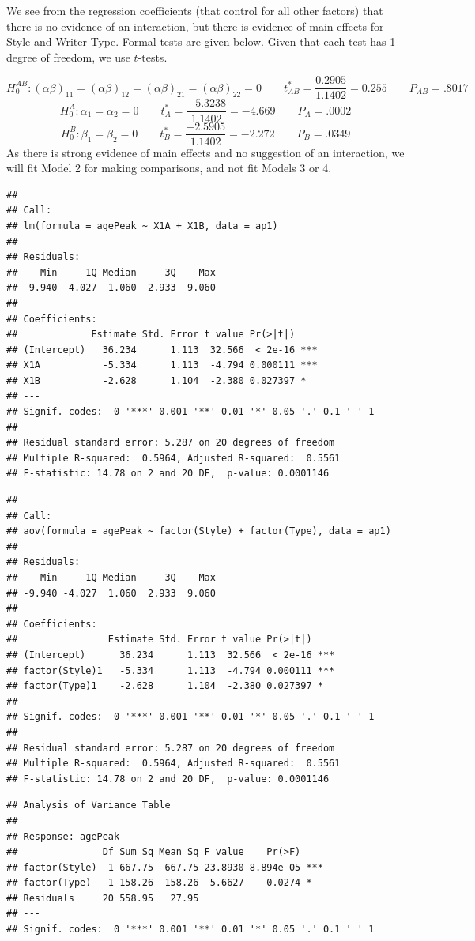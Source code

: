 \documentclass[
]{book}
\begin{document}
We see from the regression coefficients (that control for all other
factors) that there is no evidence of an interaction, but there is
evidence of main effects for Style and Writer Type. Formal tests are
given below. Given that each test has 1 degree of freedom, we use
\(t\)-tests.

\[
H_0^{AB}: (\alpha\beta)_{11}=(\alpha\beta)_{12}=(\alpha\beta)_{21}=(\alpha\beta)_{22}=0
\qquad
t_{AB}^*=\frac{0.2905}{1.1402}=0.255
\qquad P_{AB}=.8017
\] \[
H_0^A:\alpha_1=\alpha_2=0 \qquad
t_A^*=\frac{-5.3238}{1.1402}=-4.669 \qquad P_A=.0002
\] \[
H_0^B: \beta_1=\beta_2=0 \qquad
t_B^*=\frac{-2.5905}{1.1402}=-2.272   \qquad P_B=.0349
\] As there is strong evidence of main effects and no suggestion of an
interaction, we will fit Model 2 for making comparisons, and not fit
Models 3 or 4.

\begin{verbatim}
## 
## Call:
## lm(formula = agePeak ~ X1A + X1B, data = ap1)
## 
## Residuals:
##    Min     1Q Median     3Q    Max 
## -9.940 -4.027  1.060  2.933  9.060 
## 
## Coefficients:
##             Estimate Std. Error t value Pr(>|t|)    
## (Intercept)   36.234      1.113  32.566  < 2e-16 ***
## X1A           -5.334      1.113  -4.794 0.000111 ***
## X1B           -2.628      1.104  -2.380 0.027397 *  
## ---
## Signif. codes:  0 '***' 0.001 '**' 0.01 '*' 0.05 '.' 0.1 ' ' 1
## 
## Residual standard error: 5.287 on 20 degrees of freedom
## Multiple R-squared:  0.5964, Adjusted R-squared:  0.5561 
## F-statistic: 14.78 on 2 and 20 DF,  p-value: 0.0001146
\end{verbatim}

\begin{verbatim}
## 
## Call:
## aov(formula = agePeak ~ factor(Style) + factor(Type), data = ap1)
## 
## Residuals:
##    Min     1Q Median     3Q    Max 
## -9.940 -4.027  1.060  2.933  9.060 
## 
## Coefficients:
##                Estimate Std. Error t value Pr(>|t|)    
## (Intercept)      36.234      1.113  32.566  < 2e-16 ***
## factor(Style)1   -5.334      1.113  -4.794 0.000111 ***
## factor(Type)1    -2.628      1.104  -2.380 0.027397 *  
## ---
## Signif. codes:  0 '***' 0.001 '**' 0.01 '*' 0.05 '.' 0.1 ' ' 1
## 
## Residual standard error: 5.287 on 20 degrees of freedom
## Multiple R-squared:  0.5964, Adjusted R-squared:  0.5561 
## F-statistic: 14.78 on 2 and 20 DF,  p-value: 0.0001146
\end{verbatim}

\begin{verbatim}
## Analysis of Variance Table
## 
## Response: agePeak
##               Df Sum Sq Mean Sq F value    Pr(>F)    
## factor(Style)  1 667.75  667.75 23.8930 8.894e-05 ***
## factor(Type)   1 158.26  158.26  5.6627    0.0274 *  
## Residuals     20 558.95   27.95                      
## ---
## Signif. codes:  0 '***' 0.001 '**' 0.01 '*' 0.05 '.' 0.1 ' ' 1
\end{verbatim}
\end{document}
